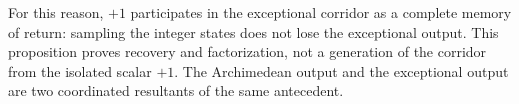 For this reason, \(+1\) participates in the exceptional corridor as a complete memory
of return: sampling the integer states does not lose the exceptional output.
This proposition proves recovery and factorization, not a generation of
the corridor from the isolated scalar \(+1\). The Archimedean output and the
exceptional output are two coordinated resultants of the same antecedent.
